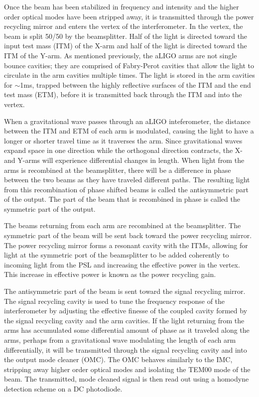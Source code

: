 Once the beam has been stabilized in frequency and intensity and the higher order 
optical modes have been stripped away, it is transmitted through the power 
recycling mirror and enters the vertex of the interferometer. In the vertex, 
the beam is split 50/50 by the beamsplitter. Half of the light is directed toward  
the input test mass (ITM) of the X-arm and half of the light is directed  
toward the ITM of the Y-arm. As mentioned previously, the aLIGO arms are not 
single bounce cavities; they are comprised of Fabry-Perot cavities that allow the 
light to circulate in the arm cavities multiple times. The light is stored in 
the arm cavities for $\sim$1ms, trapped between the highly reflective surfaces 
of the ITM and the end test mass (ETM), before it is transmitted back through 
the ITM and into the vertex.

When a gravitational wave passes through an aLIGO inteferometer, the distance
between the ITM and ETM of each arm is modulated, causing the light to have a
longer or shorter travel time as it traverses the arm. Since gravitational
waves expand space in one direction while the orthogonal direction contracts,     
the X- and Y-arms will experience differential changes in length. When light
from the arms is recombined at the beamsplitter, there will be a difference
in phase between the two beams as they have traveled different paths. The 
resulting light from this recombination of phase shifted beams is called the 
antisymmetric part of the output. The part of the beam that is recombined 
in phase is called the symmetric part of the output.

The beams returning from each arm are recombined at the beamsplitter. The 
symmetric part of the beam 
will be sent back toward the power recycling mirror. The power recycling mirror 
forms a resonant cavity with the ITMs, allowing for light at the symmetric 
port of the beamsplitter to be added coherently to incoming light from the PSL and 
increasing the effective power in the vertex. This increase in effective power 
is known as the power recycling gain. 

The antisymmetric part of the beam is sent toward the signal recycling mirror. 
The signal recycling cavity is used to tune the frequency response of the 
interferometer by adjusting the effective finesse of the coupled cavity 
formed by the signal recycling cavity and the arm cavities. 
If the light returning from the arms has accumulated some differential amount of 
phase as it traveled 
along the arms, perhaps from a gravitational wave modulating the length of each 
arm differentially, it will be transmitted through the signal recycling cavity 
and into the output mode cleaner (OMC). The OMC behaves similarly to the IMC, 
stripping away higher order optical modes and isolating the TEM00 mode of the 
beam. The transmitted, mode cleaned signal is then read out using a homodyne 
detection scheme on a DC photodiode. 

